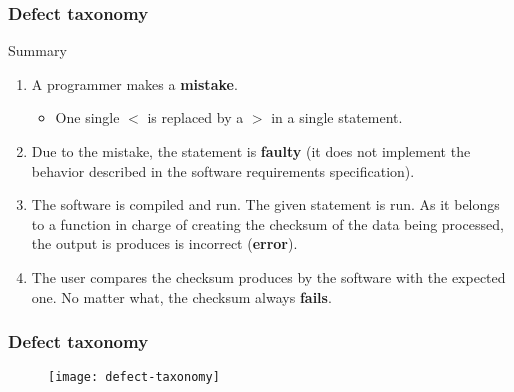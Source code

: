 \begin{frame}
\frametitle{Defect taxonomy}

\begin{block:procedure}{Summary}
\begin{enumerate}
	\item A programmer makes a \textbf{mistake}.
	\begin{itemize}
		\item One single $<$ is replaced by a $>$ in a single statement.
	\end{itemize}

	\item Due to the mistake, the statement is \textbf{faulty} (it does
	not implement the behavior described in the software requirements
	specification).

	\item The software is compiled and run. The given statement is run. As it
	belongs to a function in charge of creating the checksum of the data being
	processed, the output is produces is incorrect (\textbf{error}).

	\item The user compares the checksum produces by the software with the
	expected one. No matter what, the checksum always \textbf{fails}.
\end{enumerate}
\end{block:procedure}
\end{frame}



\begin{frame}[c]
\label{concept:defect-taxonomy}
\frametitle{Defect taxonomy}

\begin{figure}
    \centering
    \texttt{[image: defect-taxonomy]}
\end{figure}

\hfill
{}
\end{frame}
